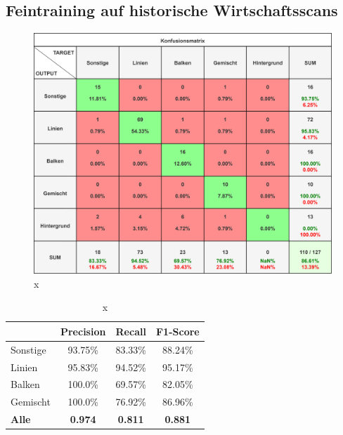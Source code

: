 \subsection{Feintraining auf historische Wirtschaftsscans}
\begin{figure}[H]
    \centering
    \captionsetup{width=1\linewidth}
    \includegraphics[width=1\textwidth]{Experimente/img/detect/val@0.891 20240612-093743_double/konfusionsmatrix.png}
    \caption{ x}
    \label{fig:extraction_output}
\end{figure}

\begin{table}[H]
    \centering
    \begin{tabular}{|l|c|c|c|}
        \hline
        \rowcolor[HTML]{EFEFEF}
                      & Precision      & Recall         & F1-Score       \\ \hline
        Sonstige      & 93.75\%        & 83.33\%        & 88.24\%        \\ \hline
        Linien        & 95.83\%        & 94.52\%        & 95.17\%        \\ \hline
        Balken        & 100.0\%        & 69.57\%        & 82.05\%        \\ \hline
        Gemischt      & 100.0\%        & 76.92\%        & 86.96\%        \\ \hline
        \textbf{Alle} & \textbf{0.974} & \textbf{0.811} & \textbf{0.881} \\ \hline
    \end{tabular}
    \caption{x}
\end{table}


